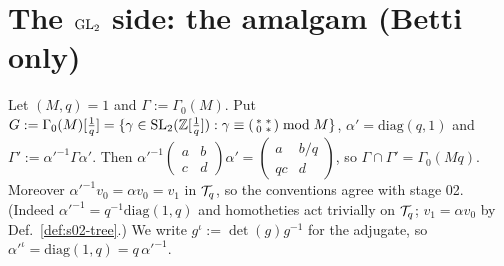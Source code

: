 \section{The \texorpdfstring{$\mathrm{GL}_2$}{GL2} side: the amalgam (Betti only)}\label{ss:s03-amalgam}
Let $(M,q)=1$ and $\Gamma:=\Gamma_0(M)$. Put $G:=\Gamma_0(M)[\frac1q]=\{\gamma\in\mathrm{SL}_2(\mathbb{Z}[\frac1q]):\gamma\equiv(\begin{smallmatrix}*&*\\0&*\end{smallmatrix})\bmod M\}$,
$\alpha'=\mathrm{diag}(q,1)$ and $\Gamma':=\alpha'^{-1}\Gamma\alpha'$. Then
$\alpha'^{-1}(\begin{smallmatrix}a&b\\c&d\end{smallmatrix})\alpha'=(\begin{smallmatrix}a&b/q\\qc&d\end{smallmatrix})$, so
$\Gamma\cap\Gamma'=\Gamma_0(Mq)$. Moreover $\alpha'^{-1}v_0=\alpha v_0=v_1$ in $\mathcal{T}_q$, so the conventions agree with stage 02.
(Indeed $\alpha'^{-1}=q^{-1}\mathrm{diag}(1,q)$ and homotheties act trivially on $\mathcal{T}_q$; $v_1=\alpha v_0$ by Def.~\ref{def:s02-tree}.)
We write $g^\iota:=\det(g)g^{-1}$ for the adjugate, so $\alpha'^\iota=\mathrm{diag}(1,q)=q\,\alpha'^{-1}$.

